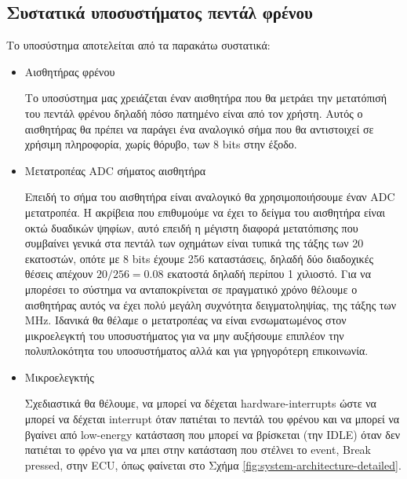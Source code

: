\documentclass{article}
\begin{document}
\subsection{Συστατικά υποσυστήματος πεντάλ φρένου}
Το υποσύστημα αποτελείται από τα παρακάτω συστατικά:
\begin{itemize}
\item Αισθητήρας φρένου
    \par
    Το υποσύστημα μας χρειάζεται έναν αισθητήρα που θα μετράει την μετατόπισή του πεντάλ φρένου δηλαδή πόσο πατημένο είναι από τον χρήστη. Αυτός ο αισθητήρας θα πρέπει να παράγει ένα αναλογικό σήμα που θα αντιστοιχεί σε χρήσιμη πληροφορία, χωρίς θόρυβο, των 8 bits στην έξοδο.
\item Μετατροπέας ADC σήματος αισθητήρα
    \par
    Επειδή το σήμα του αισθητήρα είναι αναλογικό θα χρησιμοποιήσουμε έναν ADC μετατροπέα. Η ακρίβεια που επιθυμούμε να έχει το δείγμα του αισθητήρα είναι οκτώ δυαδικών ψηφίων, αυτό επειδή η μέγιστη διαφορά μετατόπισης που συμβαίνει γενικά στα πεντάλ των οχημάτων είναι τυπικά της τάξης των 20 εκατοστών, οπότε με 8 bits έχουμε 256 καταστάσεις, δηλαδή δύο διαδοχικές θέσεις απέχουν $20/256=0.08$ εκατοστά δηλαδή περίπου 1 χιλιοστό. Για να μπορέσει το σύστημα να ανταποκρίνεται σε πραγματικό χρόνο θέλουμε ο αισθητήρας αυτός να έχει πολύ μεγάλη συχνότητα δειγματοληψίας, της τάξης των MHz. Ιδανικά θα θέλαμε ο μετατροπέας να είναι ενσωματωμένος στον μικροελεγκτή του υποσυστήματος για να μην αυξήσουμε επιπλέον την πολυπλοκότητα του υποσυστήματος αλλά και για γρηγορότερη επικοινωνία.
\item Μικροελεγκτής
    \par
    Σχεδιαστικά θα θέλουμε, να μπορεί να δέχεται hardware-interrupts ώστε να μπορεί να δέχεται interrupt όταν πατιέται το πεντάλ του φρένου και να μπορεί να βγαίνει από low-energy κατάσταση που μπορεί να βρίσκεται (την IDLE) όταν δεν πατιέται το φρένο για να μπει στην κατάσταση που στέλνει το event, Break pressed, στην ECU, όπως φαίνεται στο Σχήμα \ref{fig:system-architecture-detailed}.
\end{itemize}
\end{document}
